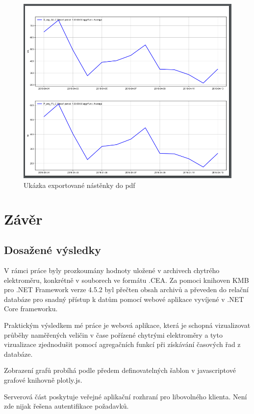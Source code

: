 \documentclass[FM,BP]{tulthesis}
\begin{document}
            \begin{figure}[h]
                \centering
                \includegraphics[scale=0.75]{pic/example1inPDF.PNG}
                \caption{Ukázka exportované nástěnky do pdf} \label{Obrázek č. 4}
            \end{figure}

\chapter{Závěr}
    \section{Dosažené výsledky}
        V rámci práce byly prozkoumány hodnoty uložené v archivech chytrého elektroměru, konkrétně v souborech ve formátu .CEA.
        Za pomoci knihoven KMB pro .NET Framework verze 4.5.2 byl přečten obsah archivů a převeden do relační databáze pro 
        snadný přístup k datům pomocí webové aplikace vyvíjené v .NET Core frameworku.

        Praktickým výsledkem mé práce je webová aplikace, která je schopná vizualizovat průběhy naměřených veličin v čase 
        pořízené chytrými elektroměry a tyto vizualizace zjednodušit pomocí agregačních funkcí při získávání časových řad z databáze.
        
        Zobrazení grafů probíhá podle předem definovatelných šablon v javascriptové grafové knihovně plotly.js.

        Serverová část poskytuje veřejné aplikační rozhraní pro libovolného klienta. Není zde nijak řešena autentifikace požadavků. 
\end{document}
